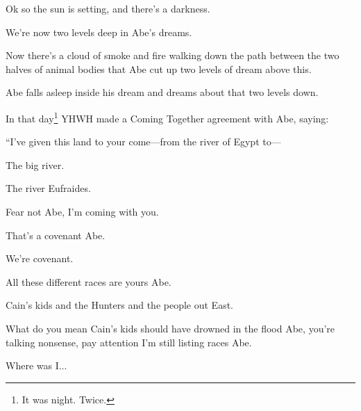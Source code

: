 {
}
{
}
{
	Ok so the sun is setting, and there's a darkness.

	We're now two levels deep in Abe's dreams.

	Now there's a cloud of smoke and fire walking down
	the path between the two halves of animal bodies
	that Abe cut up two levels of dream above this.

	Abe falls asleep inside his dream and dreams
	about that two levels down.

}

{
}
{
}
{
	In that day\footnote{It was night. Twice.}
	YHWH made a Coming Together agreement
	with Abe, saying:
	
	“I’ve given this land to your come---from
	the river of Egypt to---
	
	The big river.

	The river Eufraides.

	Fear not Abe, I'm coming with you.

	That's a covenant Abe.

	We're covenant.

}

{
}
{
}
{
	All these different races are yours Abe.

	Cain's kids and the Hunters and the people out East.

	What do you mean Cain's kids should have drowned in
	the flood Abe, you're talking nonsense, pay attention
	I'm still listing races Abe.

	Where was I...
}


